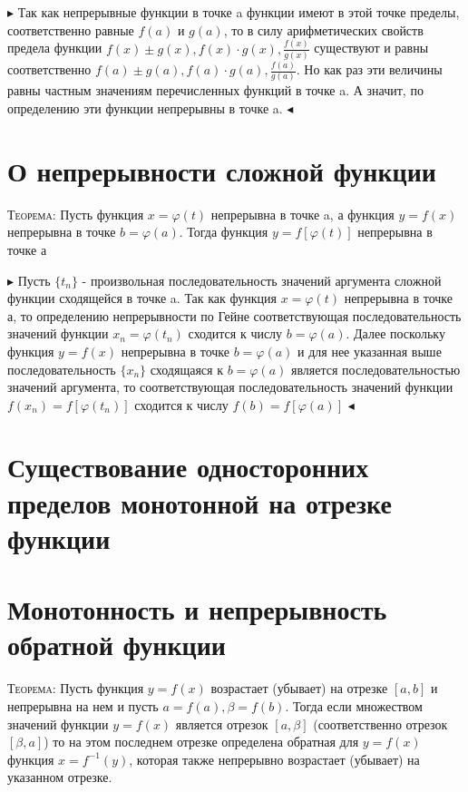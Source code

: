 \documentclass[14pt]{article}
\begin{document}
        $\blacktriangleright$ 
            Так как непрерывные функции в точке a функции имеют в этой точке пределы, соответственно равные $f(a)$ и $g(a)$, то в силу арифметических свойств предела функции $f(x)\pm g(x), f(x) \cdot g(x), \frac{f(x)}{g(x)}$ существуют и равны соответственно $f(a)\pm g(a), f(a) \cdot g(a), \frac{f(a)}{g(a)}$. Но как раз эти величины равны частным значениям перечисленных функций в точке a. А значит, по определению эти функции непрерывны в точке a.
        $\blacktriangleleft$\\
    \section{О непрерывности сложной функции} 
        \textsc{Теорема:} Пусть функция $x=\varphi (t)$ непрерывна в точке a, а функция $y=f(x)$ непрерывна в точке $b=\varphi(a) $. Тогда функция $y=f[\varphi(t)]$ непрерывна в точке а
        
        $\blacktriangleright$ 
            Пусть $\{t_n\}$ - произвольная последовательность значений аргумента сложной функции сходящейся в точке a. Так как функция $x=\varphi(t)$ непрерывна в точке а, то определению непрерывности по Гейне соответствующая последовательность значений функции $x_n = \varphi(t_n)$ сходится к числу $b = \varphi(a)$. Далее поскольку функция $y=f(x)$ непрерывна в точке $b=\varphi(a)$ и для нее указанная выше последовательность $\{x_n\}$ сходящаяся к $b=\varphi(a)$ является последовательностью значений аргумента, то соответствующая последовательность значений функции $f(x_n) = f[\varphi(t_n)] $ сходится к числу $f(b)=f[\varphi(a)]$
        $\blacktriangleleft$\\
    \section{Существование односторонних пределов монотонной на отрезке функции}
    \section{Монотонность и непрерывность обратной функции}
        \textsc{Теорема:} Пусть функция $y=f(x)$ возрастает (убывает) на отрезке $[a,b]$ и непрерывна на нем и пусть $a = f(a), \beta = f(b)$. Тогда если множеством значений функции $y=f(x)$ является отрезок $[a,\beta]$ (соответственно отрезок $[\beta, a]$) то на этом последнем отрезке определена обратная для $y=f(x)$ функция $x = f^{-1}(y)$, которая также непрерывно возрастает (убывает) на указанном отрезке.
\end{document}
